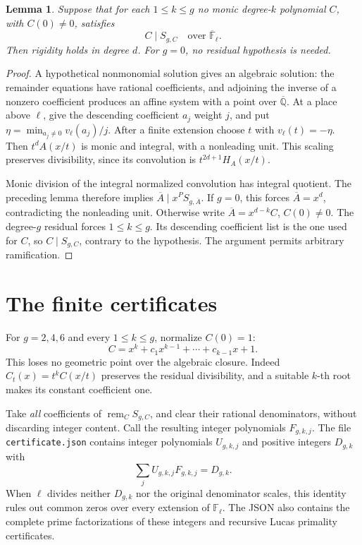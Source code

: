 \documentclass[11pt]{article}
\newtheorem{lemma}[theorem]{Lemma}
\newcommand{\QQ}{\mathbb Q}
\newcommand{\FF}{\mathbb F}
\begin{document}
\begin{lemma}
Suppose that for each \(1\le k\le g\) no monic degree-\(k\)
polynomial \(C\), with \(C(0)\ne0\), satisfies
\[
 C\mid S_{g,C}
 \quad\text{over }\overline{\FF}_\ell.
\]
Then rigidity holds in degree \(d\).
For \(g=0\), no residual hypothesis is needed.
\end{lemma}

\begin{proof}
A hypothetical nonmonomial solution gives an algebraic solution:
the remainder equations have rational coefficients, and adjoining
the inverse of a nonzero coefficient produces an affine system with
a point over \(\overline{\QQ}\).
At a place above \(\ell\), give the descending coefficient \(a_j\)
weight \(j\), and put
\(\eta=\min_{a_j\ne0}v_\ell(a_j)/j\).
After a finite extension choose \(t\) with \(v_\ell(t)=-\eta\).
Then \(t^dA(x/t)\) is monic and integral, with a nonleading unit.
This scaling preserves divisibility, since its convolution is
\(t^{2d+1}H_A(x/t)\).

Monic division of the integral normalized convolution has integral
quotient. The preceding lemma therefore implies
\(\overline A\mid x^P S_{g,\overline A}\).
If \(g=0\), this forces \(\overline A=x^d\), contradicting the
nonleading unit.
Otherwise write
\(\overline A=x^{d-k}C\), \(C(0)\ne0\).
The degree-\(g\) residual forces \(1\le k\le g\).
Its descending coefficient list is the one used for \(C\), so
\(C\mid S_{g,C}\), contrary to the hypothesis.
The argument permits arbitrary ramification.
\end{proof}

\section{The finite certificates}

For \(g=2,4,6\) and every \(1\le k\le g\), normalize \(C(0)=1\):
\[
 C=x^k+c_1x^{k-1}+\cdots+c_{k-1}x+1.
\]
This loses no geometric point over the algebraic closure.
Indeed \(C_t(x)=t^kC(x/t)\) preserves the residual divisibility,
and a suitable \(k\)-th root makes its constant coefficient one.

Take \emph{all} coefficients of
\(\operatorname{rem}_C S_{g,C}\), and clear their rational
denominators, without discarding integer content.
Call the resulting integer polynomials \(F_{g,k,j}\).
The file \texttt{certificate.json} contains integer polynomials
\(U_{g,k,j}\) and positive integers \(D_{g,k}\) with
\[
 \sum_j U_{g,k,j}F_{g,k,j}=D_{g,k}.
\]
When \(\ell\) divides neither \(D_{g,k}\) nor the original
denominator scales, this identity rules out common zeros over
every extension of \(\FF_\ell\).
The JSON also contains the complete prime factorizations of these
integers and recursive Lucas primality certificates.
\end{document}
